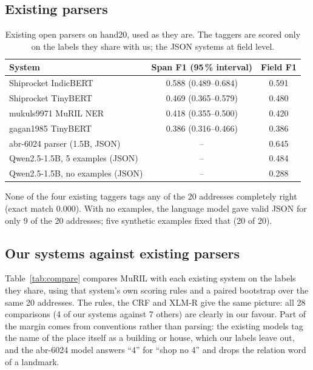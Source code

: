 \documentclass[11pt,a4paper]{article}
\begin{document}
\subsection{Existing parsers}
\begin{table}[H]
\centering\small
\caption[Existing open parsers on hand20]{Existing open parsers on hand20, used as they are. The taggers are scored only on the labels they share with
us; the JSON systems at field level.}\label{tab:existing}
\begin{tabular}{lcc}
\toprule
\textbf{System} & \textbf{Span F1 (95\,\% interval)} & \textbf{Field F1}\\
\midrule
Shiprocket IndicBERT & 0.588 (0.489--0.684) & 0.591\\
Shiprocket TinyBERT & 0.469 (0.365--0.579) & 0.480\\
mukuls9971 MuRIL NER & 0.418 (0.355--0.500) & 0.420\\
gagan1985 TinyBERT & 0.386 (0.316--0.466) & 0.386\\
abr-6024 parser (1.5B, JSON) & -- & 0.645\\
Qwen2.5-1.5B, 5 examples (JSON) & -- & 0.484\\
Qwen2.5-1.5B, no examples (JSON) & -- & 0.288\\
\bottomrule
\end{tabular}
\end{table}

None of the four existing taggers tags any of the 20 addresses completely right (exact match 0.000). With no examples,
the language model gave valid JSON for only 9 of the 20 addresses; five synthetic examples fixed that (20 of 20).

\subsection{Our systems against existing parsers}
Table~\ref{tab:compare} compares MuRIL with each existing system on the labels they share, using that system's own
scoring rules and a paired bootstrap over the same 20 addresses. The rules, the CRF and \mbox{XLM-R} give the same picture:
all 28 comparisons (4 of our systems against 7 others) are clearly in our favour. Part of the margin comes from
conventions rather than parsing: the existing models tag the name of the place itself as a building or house, which
our labels leave out, and the abr-6024 model answers ``4'' for ``shop no 4'' and drops the relation word of a
landmark.
\end{document}
